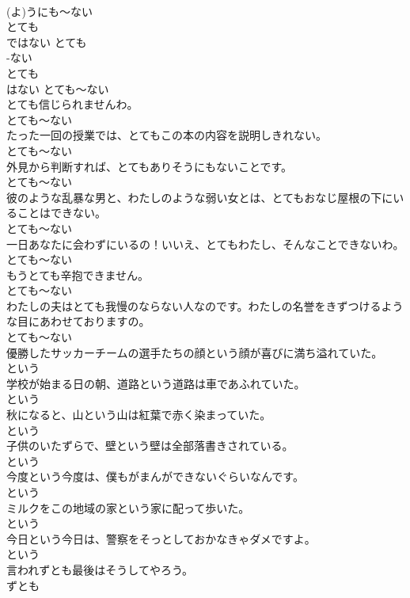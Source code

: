 \documentclass[8pt]{extreport}
\begin{document}
\begin{CJK}{UTF8}{min}
\\	(よ)うにも～ない	
\\	とても 
\\	ではない	とても 
\\	-ない
\\	とても 
\\	はない	とても～ない	
\\	とても信じられませんわ。	
\\	とても～ない	
\\	たった一回の授業では、とてもこの本の内容を説明しきれない。	
\\	とても～ない	
\\	外見から判断すれば、とてもありそうにもないことです。	
\\	とても～ない	
\\	彼のような乱暴な男と、わたしのような弱い女とは、とてもおなじ屋根の下にいることはできない。	
\\	とても～ない	
\\	一日あなたに会わずにいるの！いいえ、とてもわたし、そんなことできないわ。	
\\	とても～ない	
\\	もうとても辛抱できません。	
\\	とても～ない	
\\	わたしの夫はとても我慢のならない人なのです。わたしの名誉をきずつけるような目にあわせておりますの。	
\\	とても～ない	
\\	優勝したサッカーチームの選手たちの顔という顔が喜びに満ち溢れていた。	
\\	という	
\\	学校が始まる日の朝、道路という道路は車であふれていた。	
\\	という	
\\	秋になると、山という山は紅葉で赤く染まっていた。	
\\	という	
\\	子供のいたずらで、壁という壁は全部落書きされている。	
\\	という	
\\	今度という今度は、僕もがまんができないぐらいなんです。	
\\	という	
\\	ミルクをこの地域の家という家に配って歩いた。	
\\	という	
\\	今日という今日は、警察をそっとしておかなきゃダメですよ。	
\\	という	
\\	言われずとも最後はそうしてやろう。	
\\	ずとも	

\end{CJK}
\end{document}

